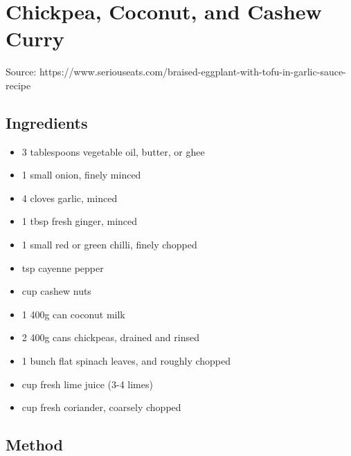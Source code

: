\section{Chickpea, Coconut, and Cashew Curry}


Source: https://www.seriouseats.com/braised-eggplant-with-tofu-in-garlic-sauce-recipe

\subsection{Ingredients}

\begin{itemize}
    \item 3 tablespoons vegetable oil, butter, or ghee
    \item 1 small onion, finely minced
    \item 4 cloves garlic, minced
    \item 1 tbsp fresh ginger, minced
    \item 1 small red or green chilli, finely chopped
    \item {} tsp cayenne pepper
    \item {} cup cashew nuts
    \item 1 400g can coconut milk
    \item 2 400g cans chickpeas, drained and rinsed
    \item 1 bunch flat spinach leaves, and roughly chopped
    \item {} cup fresh lime juice (3-4 limes)
    \item {} cup fresh coriander, coarsely chopped
\end{itemize}

\subsection{Method}

